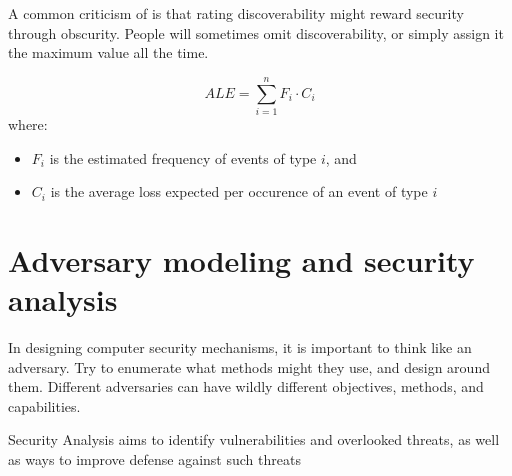 A common criticism of  is that rating discoverability might reward security through obscurity. People will sometimes omit discoverability, or simply assign it the maximum value all the time.


\[ ALE = \sum_{i=1}^{n} F_i \cdot C_i \]
where:
\begin{itemize}
    \item $F_i$ is the estimated frequency of events of type $i$, and
    \item $C_i$ is the average loss expected per occurence of an event of type $i$
\end{itemize}

\section{Adversary modeling and security analysis}


In designing computer security mechanisms, it is important to think like an adversary. Try to enumerate what methods might they use, and design around them. Different adversaries can have wildly different objectives, methods, and capabilities.

\begin{dfnbox}{Security Analysis}{}
     aims to identify vulnerabilities and overlooked threats, as well as ways to improve defense against such threats
\end{dfnbox}

